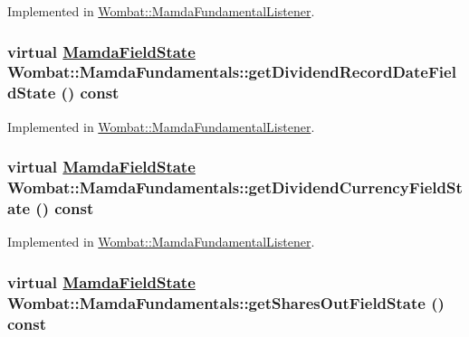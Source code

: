 Implemented in \hyperlink{classWombat_1_1MamdaFundamentalListener_5eecefe805188a8575e9fa0239145708}{Wombat::Mamda\-Fundamental\-Listener}.\hypertarget{classWombat_1_1MamdaFundamentals_d08e80fd98352ba7eaa5beafaaad9d55}{
\subsubsection[getDividendRecordDateFieldState]{\setlength{\rightskip}{0pt plus 5cm}virtual \hyperlink{namespaceWombat_93aac974f2ab713554fd12a1fa3b7d2a}{Mamda\-Field\-State} Wombat::Mamda\-Fundamentals::get\-Dividend\-Record\-Date\-Field\-State () const}}
\label{classWombat_1_1MamdaFundamentals_d08e80fd98352ba7eaa5beafaaad9d55}




Implemented in \hyperlink{classWombat_1_1MamdaFundamentalListener_baaedf6fb1b2eae95df6617d0b893224}{Wombat::Mamda\-Fundamental\-Listener}.\hypertarget{classWombat_1_1MamdaFundamentals_a4d435932821fbb0f1e9eb9da90c47cc}{
\subsubsection[getDividendCurrencyFieldState]{\setlength{\rightskip}{0pt plus 5cm}virtual \hyperlink{namespaceWombat_93aac974f2ab713554fd12a1fa3b7d2a}{Mamda\-Field\-State} Wombat::Mamda\-Fundamentals::get\-Dividend\-Currency\-Field\-State () const}}
\label{classWombat_1_1MamdaFundamentals_a4d435932821fbb0f1e9eb9da90c47cc}




Implemented in \hyperlink{classWombat_1_1MamdaFundamentalListener_e30b3e82e42b4477de977764592731ee}{Wombat::Mamda\-Fundamental\-Listener}.\hypertarget{classWombat_1_1MamdaFundamentals_3e81462fdbe5d194b64656ad44d98711}{
\subsubsection[getSharesOutFieldState]{\setlength{\rightskip}{0pt plus 5cm}virtual \hyperlink{namespaceWombat_93aac974f2ab713554fd12a1fa3b7d2a}{Mamda\-Field\-State} Wombat::Mamda\-Fundamentals::get\-Shares\-Out\-Field\-State () const}}
\label{classWombat_1_1MamdaFundamentals_3e81462fdbe5d194b64656ad44d98711}




